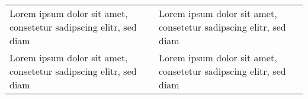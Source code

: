 

\begin{table}[htb]

\ifthenelse{\isundefined{\tabLenA}}{\newlength{\tabLenA\tabLenA}}{}
\ifthenelse{\isundefined{\tabLenB}}{\newlength{\tabLenB\tabLenB}}{}

\setlength{\tabLenA}{0.10\textwidth}
\setlength{\tabLenB}{0.20\textwidth}

\begin{tabularx}{\textwidth}{p{\tabLenA}p{\tabLenB}}
\toprule
\toprule

Lorem ipsum dolor sit amet, consetetur sadipscing elitr, sed diam
&

Lorem ipsum dolor sit amet, consetetur sadipscing elitr, sed diam
\\

Lorem ipsum dolor sit amet, consetetur sadipscing elitr, sed diam
&

Lorem ipsum dolor sit amet, consetetur sadipscing elitr, sed diam
\\
\bottomrule
\end{tabularx}
\end{table}

